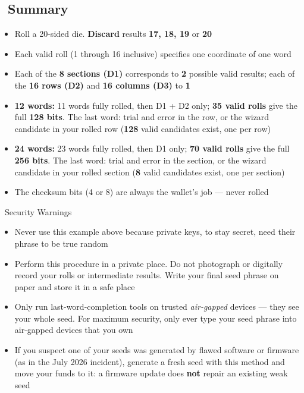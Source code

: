 \documentclass[10pt]{article}
\begin{document}
\subsection*{\faListOl~Summary}

\begin{itemize}[itemsep=1pt]
 \item Roll a 20-sided die. \textbf{Discard} results \textbf{17, 18, 19} or \textbf{20}
 \item Each valid roll (1 through 16 inclusive) specifies one coordinate of one word
 \item Each of the \textbf{8 sections (D1)} corresponds to \textbf{2} possible valid results; each of the \textbf{16 rows (D2)} and \textbf{16 columns (D3)} to \textbf{1}
 \item \textbf{12 words:} 11 words fully rolled, then D1 + D2 only; \textbf{35 valid rolls} give the full \textbf{128 bits}. The last word: trial and error in the row, or the wizard candidate in your rolled row (\textbf{128} valid candidates exist, one per row)
 \item \textbf{24 words:} 23 words fully rolled, then D1 only; \textbf{70 valid rolls} give the full \textbf{256 bits}. The last word: trial and error in the section, or the wizard candidate in your rolled section (\textbf{8} valid candidates exist, one per section)
 \item The checksum bits (4 or 8) are always the wallet's job --- never rolled
\end{itemize}

\begin{warnbox}{\faExclamationTriangle~Security Warnings}
\begin{itemize}[itemsep=1pt]
 \item Never use this example above because private keys, to stay secret, need their phrase to be true random
 \item Perform this procedure in a private place. Do not photograph or digitally record your rolls or intermediate results. Write your final seed phrase on paper and store it in a safe place
 \item Only run last-word-completion tools on trusted \textit{air-gapped} devices --- they see your whole seed. For maximum security, only ever type your seed phrase into air-gapped devices that you own
 \item If you suspect one of your seeds was generated by flawed software or firmware (as in the July 2026 incident), generate a fresh seed with this method and move your funds to it: a firmware update does \textbf{not} repair an existing weak seed
\end{itemize}
\end{warnbox}
\end{document}
